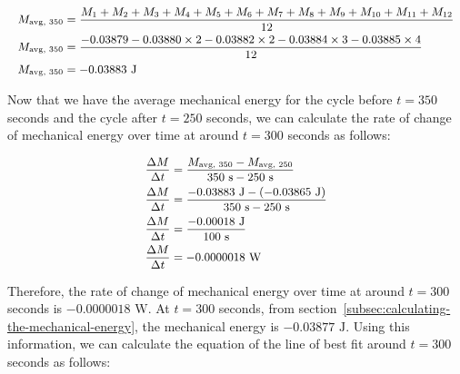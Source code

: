 \documentclass[titlepage]{article}
\begin{document}
            \begin{equation}
                \small
                \begin{aligned}
                    M_{\text{avg, 350}} &= \frac{M_1 + M_2 + M_3 + M_4 + M_5 + M_6 + M_7 + M_8 + M_9 + M_{10} + M_{11} + M_{12}}{12} \\
                    M_{\text{avg, 350}} &= \frac{-0.03879 -0.03880 \times 2 -0.03882 \times 2 -0.03884 \times 3 -0.03885 \times 4}{12} \\
                    M_{\text{avg, 350}} &= -0.03883 \text{ J} \\
                \end{aligned}\label{eq:average-mechanical-energy-cycle-at-350-seconds}
            \end{equation}
            
            Now that we have the average mechanical energy for the cycle before $t=350$ seconds and the cycle after $t=250$ seconds, we can calculate the rate of change of mechanical energy over time at around $t=300$ seconds as follows:
            
            \begin{equation}
                \small
                \begin{aligned}
                    \frac{\Delta M}{\Delta t} &= \frac{M_{\text{avg, 350}} - M_{\text{avg, 250}}} {350 \text{ s} - 250 \text{ s}} \\
                    \frac{\Delta M}{\Delta t} &= \frac{-0.03883 \text{ J} - (-0.03865 \text{ J})} {350 \text{ s} - 250 \text{ s}} \\
                    \frac{\Delta M}{\Delta t} &= \frac{-0.00018 \text{ J}} {100 \text{ s}} \\
                    \frac{\Delta M}{\Delta t} &= -0.0000018 \text{ W} \\
                \end{aligned}\label{eq:rate-of-change-of-mechanical-energy-over-time-around-300-seconds}
            \end{equation}
            
            Therefore, the rate of change of mechanical energy over time at around $t=300$ seconds is $-0.0000018 \text{ W}$.
            At $t=300$ seconds, from section~\ref{subsec:calculating-the-mechanical-energy}, the mechanical energy is $-0.03877 \text{ J}$.
            Using this information, we can calculate the equation of the line of best fit around $t=300$ seconds as follows:
            
\end{document}
